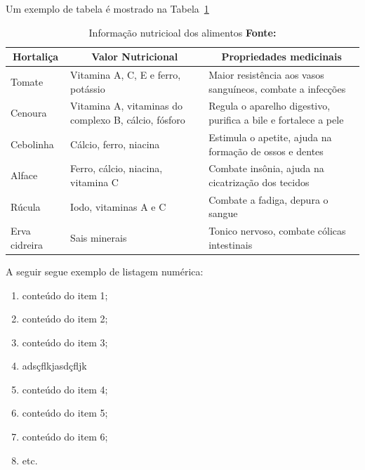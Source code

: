 \par Um exemplo de tabela é mostrado na Tabela~\ref{tab:informativa}


\begin{table} [h]
  \caption[Informação nutricioal dos alimentos]
          {Informação nutricioal dos alimentos \textbf{Fonte:} \cite{correa2003plantas}}
  \centering
  \begin{tabular}{|p{0.7in}|p{2in}|p{3in}|}
    \hline 
    \multicolumn{1}{|c|}{\textbf{Hortaliça}} & \multicolumn{1}{c|}{\textbf{Valor Nutricional}} & \multicolumn{1}{c|}{\textbf{Propriedades medicinais}} \\
    \hline 
Tomate
&Vitamina A, C, E e ferro, potássio
&Maior resistência aos vasos sanguíneos, combate a infecções\\
    \hline 
Cenoura
&Vitamina A, vitaminas do complexo B, cálcio, fósforo
&Regula o aparelho digestivo, purifica a bile e fortalece a pele\\
    \hline
Cebolinha
&Cálcio, ferro, niacina
&Estimula o apetite, ajuda na formação de ossos e dentes\\

    \hline
Alface
&Ferro, cálcio, niacina, vita\-mina C
&Combate insônia, ajuda na cicatrização dos tecidos\\

    \hline
Rúcula
&Iodo, vitaminas A e C
&Combate a fadiga, depura o sangue\\

    \hline
Erva cidreira
&Sais minerais
&Tonico nervoso, combate cólicas intestinais\\

    \hline 
  \end{tabular}
  \label{tab:informativa}
\end{table}

\par A seguir segue exemplo de listagem numérica:

\begin{enumerate}
  \item conteúdo do item 1;
  \item conteúdo do item 2;
  \item conteúdo do item 3;
  \item adsçflkjasdçfljk
  \item conteúdo do item 4;
  \item conteúdo do item 5;
  \item conteúdo do item 6;
  \item etc.
\end{enumerate}

